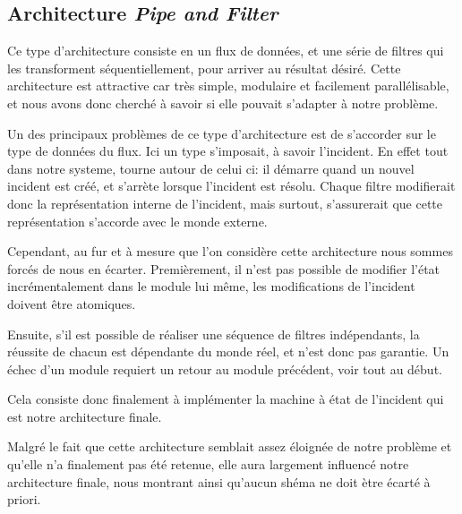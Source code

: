 \subsection{Architecture \emph{Pipe and Filter}}
	Ce type d'architecture consiste en un flux de données,
	et une série de filtres qui les transforment séquentiellement,
	pour arriver au résultat désiré. Cette architecture est
	attractive car très simple, modulaire et facilement parallélisable,
	et nous avons donc cherché à savoir si elle pouvait s'adapter à
	notre problème.

	Un des principaux problèmes de ce type d'architecture est de
	s'accorder sur le type de données du flux. Ici un type s'imposait,
	à savoir l'incident. En effet tout dans notre systeme, tourne
	autour de celui ci: il démarre quand un nouvel incident est créé,
	et s'arrète lorsque l'incident est résolu. Chaque filtre modifierait
	donc la représentation interne de l'incident, mais surtout, s'assurerait
	que cette représentation s'accorde avec le monde externe.

	Cependant, au fur et à mesure que l'on considère cette architecture
	nous sommes forcés de nous en écarter. Premièrement, il n'est pas 
	possible de modifier l'état incrémentalement dans le module lui même,
	les modifications de l'incident doivent être atomiques.

	Ensuite, s'il est possible de réaliser une séquence de filtres
	indépendants, la réussite de chacun est dépendante du monde réel,
	et n'est donc pas garantie. Un échec d'un module requiert
	un retour au module précédent, voir tout au début. 
	
	Cela consiste donc finalement à implémenter la machine à état de 
	l'incident qui est notre architecture finale.

	Malgré le fait que cette architecture semblait assez éloignée
	de notre problème et qu'elle n'a finalement pas été retenue,
	elle aura largement influencé notre architecture finale, nous
	montrant ainsi qu'aucun shéma ne doit ètre écarté à priori.
